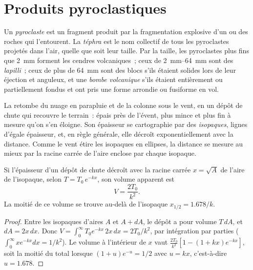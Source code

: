 \section{Produits pyroclastiques}

\begin{definition}\label{def:b2:eruptive-styles:tephra}
Un \emph{pyroclaste} est un fragment produit par la fragmentation explosive
d'un  ou des roches qui l'entourent. La \emph{téphra} est le nom collectif de tous les
pyroclastes projetés dans l'air, quelle que soit leur taille.
Par la taille, les pyroclastes plus fins que \qty{2}{mm} forment les cendres volcaniques~; ceux de
\qtyrange{2}{64}{mm} sont des \emph{lapilli}~; ceux de plus de
\qty{64}{mm} sont des blocs s'ils étaient solides lors de leur éjection et anguleux, et une
\emph{bombe volcanique} s'ils étaient entièrement ou partiellement fondus
et ont pris une forme arrondie ou fusiforme en vol.
\end{definition}

La  retombe du nuage en parapluie et de la colonne sous le vent, en un dépôt de chute qui recouvre
le terrain~: épais près de l'évent, plus mince et plus fin à mesure qu'on s'en éloigne. Son
épaisseur se cartographie par des \emph{isopaques}, lignes d'égale épaisseur, et, en règle générale,
elle décroît exponentiellement avec la distance. Comme le vent étire les isopaques
en ellipses, la distance se mesure au mieux par la racine carrée de l'aire
enclose par chaque isopaque.

\begin{proposition}\label{prop:b2:eruptive-styles:thinning}
Si l'épaisseur d'un dépôt de chute décroît avec la racine carrée $x = \sqrt A$
de l'aire de l'isopaque, selon $T = T_0\,e^{-kx}$, son volume apparent est
\[
V = \frac{2T_0}{k^2}.
\]
La moitié de ce volume se trouve au-delà de l'isopaque $x_{1/2} = 1.678/k$.
\end{proposition}

\begin{proof}
Entre les isopaques d'aires $A$ et $A + dA$, le dépôt a pour volume $T\,dA$,
et $dA = 2x\,dx$. Donc $V = \int_0^\infty T_0e^{-kx}\,2x\,dx = 2T_0/k^2$, par
intégration par parties ($\int_0^\infty xe^{-kx}dx = 1/k^2$). Le volume à l'intérieur de $x$
vaut $\frac{2T_0}{k^2}[1 - (1 + kx)e^{-kx}]$, soit la moitié du total lorsque $(1 +
u)e^{-u} = 1/2$ avec $u = kx$, c'est-à-dire $u = 1.678$.
\end{proof}

